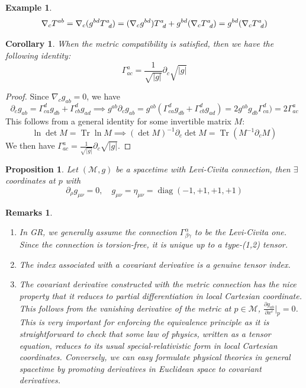 \documentclass[a4paper]{article}
\DeclareMathOperator{\Tr}{Tr}
\DeclareMathOperator{\diag}{diag}
\newtheorem{eg}{Example}[section]
\newtheorem{remarks}{Remarks}[section]
\theoremstyle{new}
\newtheorem{prop}{Proposition}[section]
\newtheorem{cor}{Corollary}[section]
\begin{document}
\begin{eg}
$$\nabla_cT^{ab}=\nabla_c(g^{bd}\tensor*{T}{*_{}^{a}_{d}})=(\nabla_cg^{bd})\tensor*{T}{*_{}^{a}_{d}}+g^{bd}(\nabla_c\tensor*{T}{*_{}^{a}_{d}})=g^{bd}(\nabla_c\tensor*{T}{*_{}^{a}_{d}})$$
\end{eg}
\begin{cor}
When the metric compatibility is satisfied, then we have the following identity:
\begin{equation}
\Gamma_{ac}^a=\frac{1}{\sqrt{|g|}}\partial_c\sqrt{|g|}\label{connectionidentity1}
\end{equation}
\end{cor}
\begin{proof}
Since $\nabla_cg_{ab}=0$, we have
$$\partial_cg_{ab}=\Gamma^d_{ca}g_{db}+\Gamma^d_{cb}g_{ad}\implies g^{ab}\partial_cg_{ab}=g^{ab}(\Gamma^d_{ca}g_{db}+\Gamma^d_{cb}g_{ad})=2g^{ab}g_{db}\Gamma^d_{ca})=2\Gamma^a_{ac}$$
This follows from a general identity for some invertible matrix $M$:
$$\ln\det M=\Tr\ln M\implies (\det M)^{-1}\partial_c\det M=\Tr(M^{-1}\partial_cM)$$ 
We then have $\Gamma_{ac}^a=\frac{1}{\sqrt{|g|}}\partial_c\sqrt{|g|}$. 
\end{proof}
\begin{prop}\label{localcoordprop3}
Let $(\mathcal{M},g)$ be a spacetime with Levi-Civita connection, then $\exists$ coordinates at $p$ with 
$$\partial_\rho g_{\mu\nu}=0,\quad g_{\mu\nu}=\eta_{\mu\nu}=\diag(-1,+1,+1,+1)$$
\end{prop}
\begin{remarks}\leavevmode
\begin{enumerate}
\item In GR, we generally assume the connection $\Gamma_{\beta\gamma}^\alpha$ to be the Levi-Civita one. Since the connection is torsion-free, it is unique up to a type-(1,2) tensor.
\item The index associated with a covariant derivative is a genuine tensor index.
\item The covariant derivative constructed with the metric connection has the nice property that it reduces to partial differentiation in local Cartesian coordinate. This follows from the vanishing derivative of the metric at $p\in\mathcal{M}$, $\frac{\partial g_{ab}}{\partial x^c}|_p=0$. This is very important for enforcing the equivalence principle as it is straightforward to check that some law of physics, written as a tensor equation, reduces to its usual special-relativistic form in local Cartesian coordinates. Conversely, we can easy formulate physical theories in general spacetime by promoting derivatives in Euclidean space to covariant derivatives.
\end{enumerate}
\end{remarks}
\end{document}
